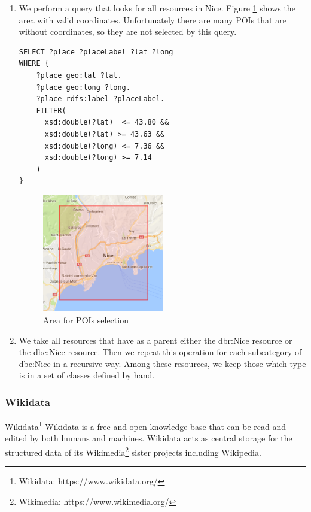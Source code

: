 \documentclass[paper=a4, fontsize=11pt]{scrartcl}
\begin{document}
\begin{enumerate}
\item We perform a query that looks for all resources in Nice. 
Figure \ref{fig:box} shows the area with valid coordinates.
Unfortunately there are many POIs that are without coordinates, so they are not selected by this query.
\begin{lstlisting}
SELECT ?place ?placeLabel ?lat ?long
WHERE {
    ?place geo:lat ?lat.
    ?place geo:long ?long.
    ?place rdfs:label ?placeLabel.
    FILTER(
      xsd:double(?lat)  <= 43.80 &&
      xsd:double(?lat) >= 43.63 &&
      xsd:double(?long) <= 7.36 &&
      xsd:double(?long) >= 7.14
    )
}
\end{lstlisting}
\begin{figure}[!htb]
  \centering 
    \includegraphics[width=0.5\textwidth]{images/Nice.png}
    \caption{Area for POIs selection}
    \label{fig:box}
\end{figure}

\item We take all resources that have as a parent either the dbr:Nice resource or the dbc:Nice resource. Then we repeat this operation for each subcategory of dbc:Nice in a recursive way. Among these resources, we keep those which type is in a set of classes defined by hand.
\end{enumerate}
\subsubsection{Wikidata}
Wikidata\footnote{Wikidata: https://www.wikidata.org/} Wikidata is a free and open knowledge base that can be read and edited by both humans and machines. Wikidata acts as central storage for the structured data of its Wikimedia\footnote{Wikimedia: https://www.wikimedia.org/} sister projects including Wikipedia.
\end{document}
